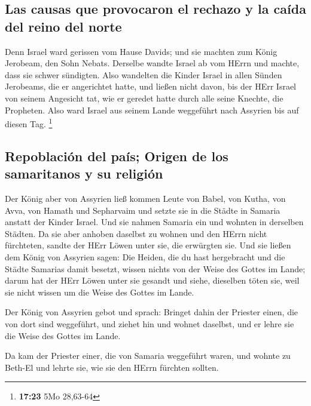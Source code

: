 \hypertarget{las-causas-que-provocaron-el-rechazo-y-la-cauxedda-del-reino-del-norte}{%
\subsection{Las causas que provocaron el rechazo y la caída del reino
del
norte}\label{las-causas-que-provocaron-el-rechazo-y-la-cauxedda-del-reino-del-norte}}

 Denn Israel ward gerissen vom Hause Davids; und sie
machten zum König Jerobeam, den Sohn Nebats. Derselbe wandte Israel ab
vom HErrn und machte, dass sie schwer sündigten.  Also
wandelten die Kinder Israel in allen Sünden Jerobeams, die er
angerichtet hatte, und ließen nicht davon,  bis der HErr
Israel von seinem Angesicht tat, wie er geredet hatte durch alle seine
Knechte, die Propheten. Also ward Israel aus seinem Lande weggeführt
nach Assyrien bis auf diesen Tag. \footnote{\textbf{17:23} 5Mo 28,63-64}

\hypertarget{repoblaciuxf3n-del-pauxeds-origen-de-los-samaritanos-y-su-religiuxf3n}{%
\subsection{Repoblación del país; Origen de los samaritanos y su
religión}\label{repoblaciuxf3n-del-pauxeds-origen-de-los-samaritanos-y-su-religiuxf3n}}

 Der König aber von Assyrien ließ kommen Leute von Babel,
von Kutha, von Avva, von Hamath und Sepharvaim und setzte sie in die
Städte in Samaria anstatt der Kinder Israel. Und sie nahmen Samaria ein
und wohnten in derselben Städten.  Da sie aber anhoben
daselbst zu wohnen und den HErrn nicht fürchteten, sandte der HErr Löwen
unter sie, die erwürgten sie.  Und sie ließen dem König
von Assyrien sagen: Die Heiden, die du hast hergebracht und die Städte
Samarias damit besetzt, wissen nichts von der Weise des Gottes im Lande;
darum hat der HErr Löwen unter sie gesandt und siehe, dieselben töten
sie, weil sie nicht wissen um die Weise des Gottes im Lande.

 Der König von Assyrien gebot und sprach: Bringet dahin
der Priester einen, die von dort sind weggeführt, und ziehet hin und
wohnet daselbst, und er lehre sie die Weise des Gottes im Lande.

 Da kam der Priester einer, die von Samaria weggeführt
waren, und wohnte zu Beth-El und lehrte sie, wie sie den HErrn fürchten
sollten.

